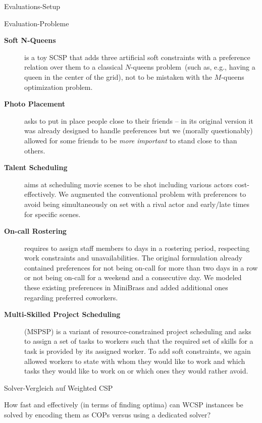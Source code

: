 \begin{frame}{Evaluations-Setup}

\end{frame}

\begin{frame}{Evaluation-Probleme}
\begin{description}
\item[\textbf{Soft N-Queens}] is a toy SCSP that adds three artificial soft constraints with a preference relation over them to a classical $N$-queens problem~(such as, e.g., having a queen in the center of the grid), not to be mistaken with the $M$-queens optimization problem.
\item[\textbf{Photo Placement}] asks to put in place people close to their friends -- in its original version it was already designed to handle preferences but we (morally questionably) allowed for some friends to be \emph{more important} to stand close to than others.
\item[\textbf{Talent Scheduling}] aims at scheduling movie scenes to be shot including various actors cost-effectively. We augmented the conventional problem with preferences to avoid being simultaneously on set with a rival actor and early/late times for specific scenes.
\item[\textbf{On-call Rostering}] requires to assign staff members to days in a rostering period, respecting work constraints and unavailabilities. The original formulation already contained preferences for not being on-call for more than two days in a row or not being on-call for a weekend and a consecutive day. We modeled these existing preferences in MiniBrass and added additional ones regarding preferred coworkers.
\item[\textbf{Multi-Skilled Project Scheduling}] (MSPSP) is a variant of resource-constrained project scheduling and asks to assign a set of tasks to workers such that the required set of skills for a task is provided by its assigned worker. To add soft constraints, we again allowed  workers to state with whom they would like to work and which tasks they would like to work on or which ones they would rather avoid.
\end{description}

\end{frame}

\begin{frame}{Solver-Vergleich auf Weighted CSP}
\begin{parchment}[Evaluationsfrage]
How fast and effectively (in terms of finding optima) can WCSP instances be solved by encoding them as COPs versus using a dedicated solver?
\end{parchment}
\end{frame}

